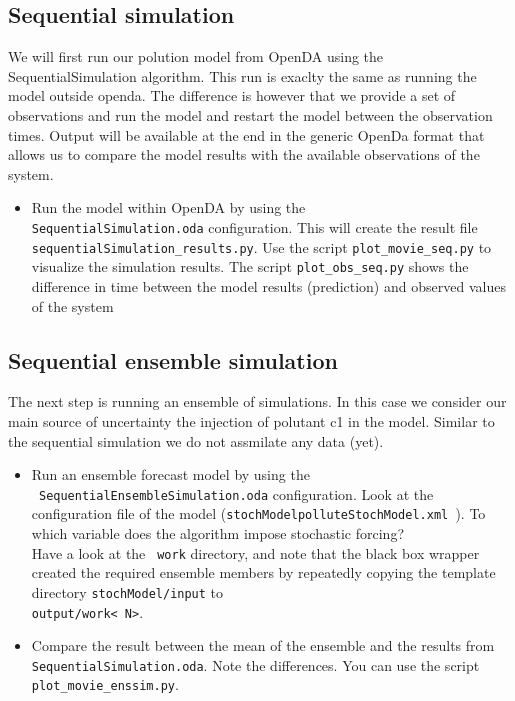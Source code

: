 
\subsection{Sequential simulation}
We will first run our polution model from OpenDA using the SequentialSimulation algorithm. This run is exaclty the same as running the model outside openda. The difference is however that we provide a set of observations and run the model and restart the model between the observation times. Output will be available at the end in the generic OpenDa format that allows us to compare the model results with the available observations of the system.

\begin{itemize}
\item Run the model within OpenDA by using
	 the \\{\tt SequentialSimulation.oda} configuration. This will create the result file 
		{\tt sequentialSimulation\_results.py}. Use the script  {\tt plot\_movie\_seq.py} to visualize
		the simulation results. The script {\tt plot\_obs\_seq.py} shows the difference in time between
		the model results (prediction) and observed values of the system
\end{itemize}

\subsection{Sequential ensemble simulation}
The next step is running an ensemble of simulations. In this case we consider our main source of uncertainty the injection of polutant c1 in the model. Similar to the sequential simulation we do not assmilate any data (yet).

\begin{itemize}
 \item Run an ensemble forecast model by using the \\{\tt
   SequentialEnsembleSimulation.oda} configuration. Look at the configuration file
   of the model ({\tt stochModel\/polluteStochModel.xml }). To which variable does the
   algorithm impose stochastic forcing?\\ Have a look at the {\tt
     work} directory, and note that the black box wrapper created
   the required ensemble members by repeatedly copying the template directory
   {\tt stochModel/input} to\\ {\tt output/work\textless
     N\textgreater}.
 \item Compare the result between the mean of the ensemble and the results from {\tt
     SequentialSimulation.oda}. Note the differences. 
     You can use the script {\tt plot\_movie\_enssim.py}.
\end{itemize}

